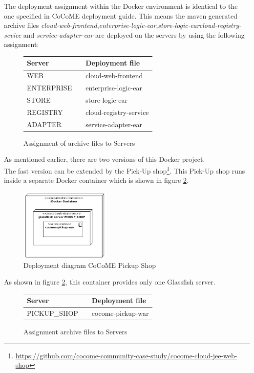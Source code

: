  	The deployment assignment within the Docker environment is identical to the one specified in CoCoME deployment guide.
 	This means the maven generated archive files \textit{cloud-web-frontend},\textit{enterprise-logic-ear},\textit{store-logic-ear}\textit{cloud-registry-sevice} and \textit{service-adapter-ear} are deployed on the servers by using the following assignment:
 	\begin{figure}[H]
 		\centering
 		\begin{tabular}{p{}|p{}p{}}
 			Server && Deployment file \\
 			\hline
 			WEB && cloud-web-frontend  \\
 			ENTERPRISE && enterprise-logic-ear  \\
 			STORE && store-logic-ear  \\
 			REGISTRY && cloud-registry-service  \\
 			ADAPTER && service-adapter-ear \\	
 		\end{tabular}
 		\caption{Assignment of archive files to Servers}
 		\label{table_assignment}
 	\end{figure}
    As mentioned earlier, there are two versions of this Docker project.\\
 	 The fast version can be extended by the Pick-Up shop\footnote{\url{https://github.com/cocome-community-case-study/cocome-cloud-jee-web-shop}}. This Pick-Up shop runs inside a separate Docker container which is shown in figure \ref{Deploym_Pickup}.  
 	\begin{figure}[h]
 		\centering
 		\includegraphics[width = 0.4\textwidth]{img/docker_Container_PickUP.png}
 		\caption{Deployment diagram CoCoME Pickup Shop}
 		\label{Deploym_Pickup}
 	\end{figure}
 	As shown in figure \ref*{Deploym_Pickup}, this container provides only one Glassfish server.
 	\begin{figure}[H]
 		\centering
 		\begin{tabular}{p{}|p{}p{}}
 			Server && Deployment file \\
 			\hline
 			PICKUP\_SHOP && cocome-pickup-war \\	
 		\end{tabular}
 		\caption{Assignment archive files to Servers}
 		\label{table_assignment_pickup}
 	\end{figure}
